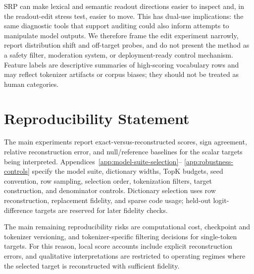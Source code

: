 SRP can make lexical and semantic readout directions easier to inspect and, in
the readout-edit stress test, easier to move. This has dual-use implications:
the same diagnostic tools that support auditing could also inform attempts to
manipulate model outputs. We therefore frame the edit experiment narrowly, report
distribution shift and off-target probes, and do not present the method as a
safety filter, moderation system, or deployment-ready control mechanism. Feature
labels are descriptive summaries of high-scoring vocabulary rows and may reflect
tokenizer artifacts or corpus biases; they should not be treated as human
categories.

\section*{Reproducibility Statement}

The main experiments report exact-versus-reconstructed scores, sign agreement,
relative reconstruction error, and null/reference baselines for the scalar
targets being interpreted. Appendices~\ref{app:model-suite-selection}--%
\ref{app:robustness-controls} specify the model suite, dictionary widths,
TopK budgets, seed convention, row sampling, selection order, tokenization
filters, target construction, and denominator controls. Dictionary selection
uses row reconstruction, replacement fidelity, and sparse code usage; held-out
logit-difference targets are reserved for later fidelity checks.

The main remaining reproducibility risks are computational cost, checkpoint and
tokenizer versioning, and tokenizer-specific filtering decisions for
single-token targets. For this reason, local score accounts include explicit
reconstruction errors, and qualitative interpretations are restricted to
operating regimes where the selected target is reconstructed with sufficient
fidelity.
